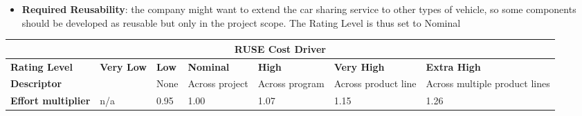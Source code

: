 \begin{itemize}
\item \textbf{Required Reusability}: the company might want to extend the car sharing service to other types of vehicle, so some components should be developed as reusable but only in the project scope. The Rating Level is thus set to Nominal
\end{itemize}
\hspace*{-3cm}\begin{tabular}{|p{3cm}|p{2cm}|p{2cm}|p{2cm}|p{2cm}|p{2cm}|p{2cm}|}
\hline
\multicolumn{7}{|c|}{\textbf{RUSE Cost Driver}}\\
\hline
\hline
\textbf{Rating Level} & \textbf{Very Low} & \textbf{Low} & \textbf{Nominal} & \textbf{High} & \textbf{Very High} & \textbf{Extra High}\\
\hline
\textbf{Descriptor} &  & None & Across project & Across program & Across product line & Across multiple product lines\\
\hline
\textbf{Effort multiplier} & n/a & 0.95 & 1.00 & 1.07 & 1.15 & 1.26\\
\hline 
\end{tabular}